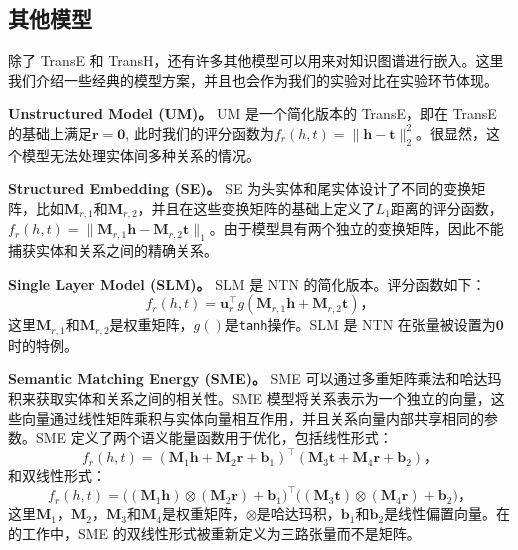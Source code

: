     \subsection{其他模型}
    除了 TransE 和 TransH，还有许多其他模型可以用来对知识图谱进行嵌入。这里我们介绍一些经典的模型方案，并且也会作为我们的实验对比在实验环节体现。

    \textbf{Unstructured Model (UM)。} UM  是一个简化版本的 TransE，即在 TransE 的基础上满足$\mathbf{r} = \mathbf{0}$, 此时我们的评分函数为$f_r(h, t) =  \|\mathbf{h} - \mathbf{t}\|_{2}^{2}$。很显然，这个模型无法处理实体间多种关系的情况。

    \textbf{Structured Embedding (SE)。} SE  为头实体和尾实体设计了不同的变换矩阵，比如$\mathbf{M}_{r, 1}$和$\mathbf{M}_{r, 2}$，并且在这些变换矩阵的基础上定义了$L_1$距离的评分函数，$f_r(h, t) =  \| \mathbf{M}_{r, 1} \mathbf{h} - \mathbf{M}_{r, 2} \mathbf{t} \|_1$。由于模型具有两个独立的变换矩阵，因此不能捕获实体和关系之间的精确关系。

    \textbf{Single Layer Model (SLM)。} SLM 是 NTN 的简化版本。评分函数如下：
    \begin{equation}
    f_{r}(h, t) = \mathbf{u}_r^\top g (\mathbf{M}_{r, 1} \mathbf{h} + \mathbf{M}_{r, 2} \mathbf{t})，
    \end{equation}
    这里$\mathbf{M}_{r, 1}$和$\mathbf{M}_{r, 2}$是权重矩阵，$g()$是\texttt{tanh}操作。SLM 是 NTN 在张量被设置为$\mathbf{0}$时的特例。


    \textbf{Semantic Matching Energy (SME)。} SME  可以通过多重矩阵乘法和哈达玛积来获取实体和关系之间的相关性。SME 模型将关系表示为一个独立的向量，这些向量通过线性矩阵乘积与实体向量相互作用，并且关系向量内部共享相同的参数。SME 定义了两个语义能量函数用于优化，包括线性形式：
    \begin{equation}
    f_r(h, t) = (\mathbf{M}_{1} \mathbf{h} + \mathbf{M}_{2} \mathbf{r} + \mathbf{b}_1 )^{\top} (\mathbf{M}_{3} \mathbf{t} + \mathbf{M}_{4} \mathbf{r} + \mathbf{b}_2)，
    \end{equation}
    和双线性形式：
    \begin{equation}
    f_r(h, t) = \big( (\mathbf{M}_{1} \mathbf{h}) \otimes (\mathbf{M}_{2} \mathbf{r}) + \mathbf{b}_1 \big)^{\top} \big( (\mathbf{M}_{3} \mathbf{t}) \otimes (\mathbf{M}_{4} \mathbf{r}) + \mathbf{b}_2 \big)，
    \end{equation}
    这里$\mathbf{M}_{1}$，$\mathbf{M}_{2}$，$\mathbf{M}_{3}$和$\mathbf{M}_{4}$是权重矩阵，$\otimes$是哈达玛积，$\mathbf{b}_1$和$\mathbf{b}_2$是线性偏置向量。在 的工作中，SME 的双线性形式被重新定义为三路张量而不是矩阵。

